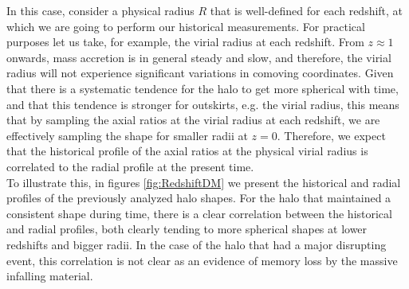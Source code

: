 In this case, consider a physical radius $R$ that is well-defined for each redshift, at which we are going to perform our historical measurements. For practical purposes let us take, for example, the virial radius at each redshift. From $z\approx 1$ onwards, mass accretion is in general steady and slow, and therefore, the virial radius will not experience significant variations in comoving coordinates. Given that there is a systematic tendence for the halo to get more spherical with time, and that this tendence is stronger for outskirts, e.g. the virial radius, this means that by sampling the axial ratios at the virial radius at each redshift, we are effectively sampling the shape for smaller radii at $z=0$. Therefore, we expect that the historical profile of the axial ratios at the physical virial radius is correlated to the radial profile at the present time. \\

To illustrate this, in figures \ref{fig:RedshiftDM} we present the historical and radial profiles of the previously analyzed halo shapes. For the halo that maintained a consistent shape during time, there is a clear correlation between the historical and radial profiles, both clearly tending to more spherical shapes at lower redshifts and bigger radii. In the case of the halo that had a major disrupting event, this correlation is not clear as an evidence of memory loss by the massive infalling material.\\  


